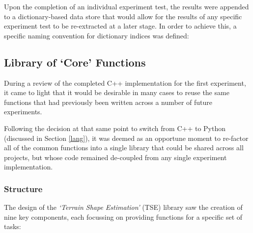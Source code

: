Upon the completion of an individual experiment test, the results were appended to a dictionary-based data store that would allow for the results of any specific experiment test to be re-extracted at a later stage. In order to achieve this, a specific naming convention for dictionary indices was defined:


\subsection{Library of `Core' Functions}

During a review of the completed C++ implementation for the first experiment, it came to light that it would be desirable in many cases to reuse the same functions that had previously been written across a number of future experiments. 

Following the decision at that same point to switch from C++ to Python (discussed in Section \ref{lang}), it was deemed as an opportune moment to re-factor all of the common functions into a single library that could be shared across all projects, but whose code remained de-coupled from any single experiment implementation. 

\subsubsection{Structure}

The design of the \textit{`Terrain Shape Estimation'} (TSE) library saw the creation of nine key components, each focussing on providing functions for a specific set of tasks:

